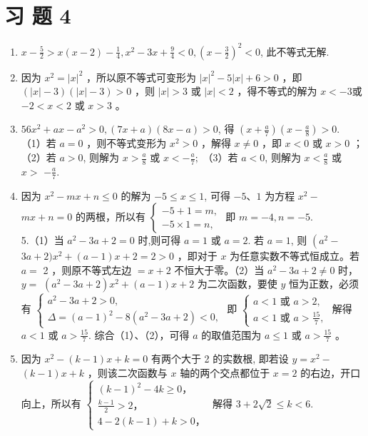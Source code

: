 \documentclass[10pt]{article}
\begin{document}
\section*{习 题 4}
\begin{enumerate}
  \item $x-\frac{5}{2}>x(x-2)-\frac{1}{4}, x^{2}-3 x+\frac{9}{4}<0,\left(x-\frac{3}{2}\right)^{2}<0$, 此不等式无解.
  \item 因为 $x^{2}=|x|^{2}$ ，所以原不等式可变形为 $|x|^{2}-5|x|+6>0$ ，即 $(|x|-3)(|x|-3)>0$ ，则 $|x|>3$ 或 $|x|<2$ ，得不等式的解为 $x<-3$或 $-2<x<2$ 或 $x>3$ 。
  \item $56 x^{2}+a x-a^{2}>0,(7 x+a)(8 x-a)>0$, 得 $\left(x+\frac{a}{7}\right)\left(x-\frac{a}{8}\right)>0$.\\
（1）若 $a=0$ ，则不等式变形为 $x^{2}>0$ ，解得 $x \neq 0$ ，即 $x<0$ 或 $x>0$ ；\\
（2）若 $a>0$, 则解为 $x>\frac{a}{8}$ 或 $x<-\frac{a}{7} ;$ （3）若 $a<0$, 则解为 $x<\frac{a}{8}$ 或 $x>$ $-\frac{a}{7}$.
  \item 因为 $x^{2}-m x+n \leqslant 0$ 的解为 $-5 \leqslant x \leqslant 1$, 可得 $-5 、 1$ 为方程 $x^{2}-$ $m x+n=0$ 的两根，所以有 $\left\{\begin{array}{l}-5+1=m, \\ -5 \times 1=n,\end{array}\right.$ 即 $m=-4, n=-5$.\\
5.（1）当 $a^{2}-3 a+2=0$ 时,则可得 $a=1$ 或 $a=2$. 若 $a=1$, 则 $\left(a^{2}-\right.$\\
$3 a+2) x^{2}+(a-1) x+2=2>0$ ，即对于 $x$ 为任意实数不等式恒成立。若 $a=$ 2 ，则原不等式左边 $=x+2$ 不恒大于零。（2）当 $a^{2}-3 a+2 \neq 0$ 时， $y=$ $\left(a^{2}-3 a+2\right) x^{2}+(a-1) x+2$ 为二次函数，要使 $y$ 恒为正数，必须有 $\left\{\begin{array}{l}a^{2}-3 a+2>0, \\ \Delta=(a-1)^{2}-8\left(a^{2}-3 a+2\right)<0,\end{array}\right.$ 即 $\left\{\begin{array}{l}a<1 \text { 或 } a>2, \\ a<1 \text { 或 } a>\frac{15}{7},\end{array}\right.$ 解得 $a<1$ 或 $a>\frac{15}{7}$. 综合（1）、（2），可得 $a$ 的取值范围为 $a \leqslant 1$ 或 $a>\frac{15}{7}$ 。
  \item 因为 $x^{2}-(k-1) x+k=0$ 有两个大于 2 的实数根, 即若设 $y=x^{2}-$ $(k-1) x+k$ ，则该二次函数与 $x$ 轴的两个交点都位于 $x=2$ 的右边，开口向上，所以有 $\left\{\begin{array}{l}(k-1)^{2}-4 k \geqslant 0 ， \\ \frac{k-1}{2}>2 ， \\ 4-2(k-1)+k>0 ，\end{array}\right.$ 解得 $3+2 \sqrt{2} \leqslant k<6$.

\end{enumerate}
\end{document}
